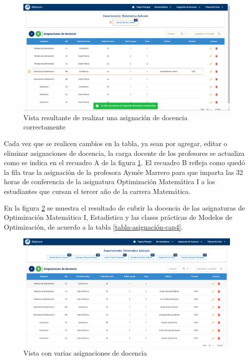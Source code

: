 \begin{figure}[H]
    \includegraphics[scale=0.3]{Graphics/Implementation/Docencia/AD-one-assign.png}
    \caption{Vista resultante de realizar una asignación de docencia correctamente}
    \label{img-ta-one-assign}
\end{figure}



Cada vez que se realicen cambios en la tabla, ya sean por agregar, editar o eliminar 
asignaciones de docencia, la carga docente de los profesores se actualiza como se indica 
en el recuadro A de la figura \ref{img-ta-one-assign}. El recuadro B refleja como quedó la fila tras la asignación de la profesora 
Aymée Marrero para que imparta las 32 horas de conferencia de la asignatura Optimización Matemática I
a los estudiantes que cursan el tercer año de la carrera Matemática.


En la figura \ref{img-ta-with-assign} se muestra el resultado de cubrir la docencia de las asignaturas de Optimización
Matemática I, Estadística y las clases prácticas de Modelos de Optimización, de acuerdo a la tabla \ref{tabla-asignación-cap4}.


\begin{figure}[H]
    \includegraphics[scale=0.3]{Graphics/Implementation/Docencia/AD-with-assigns.png}
    \caption{Vista con varias asignaciones de docencia}
    \label{img-ta-with-assign}
\end{figure}


